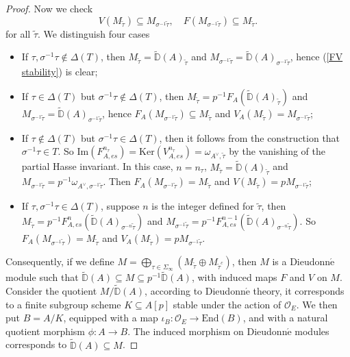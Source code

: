 \documentclass{article}
\begin{document}
\begin{proof}
Now we check
\begin{equation}\label{FV stability}
V(M_{\tilde\tau})\subseteq M_{\sigma^{-1}\tilde\tau},\quad F(M_{\sigma^{-1}\tilde\tau})\subseteq M_{\tilde\tau}.
\end{equation}
for all $\tilde\tau$. We distinguish four cases
\begin{itemize}
	\item If $\tau,\sigma^{-1}\tau\notin \Delta(T)$, then $M_{\tilde\tau}=\tilde{\mathbb{D}}(A)_{\tilde\tau}$ and $M_{\sigma^{-1}\tilde\tau}=\tilde{\mathbb{D}}(A)_{\sigma^{-1}\tilde\tau}$, hence (\ref{FV stability}) is clear;
	\item If $\tau\in\Delta(T)$ but $\sigma^{-1}\tau\notin\Delta(T)$, then $M_{\tilde\tau}=p^{-1}F_{A}(\tilde{\mathbb{D}}(A)_{\tilde\tau})$ and $M_{\sigma^{-1}\tilde\tau}=\tilde{\mathbb{D}}(A)_{\sigma^{-1}\tilde\tau}$, hence $F_A(M_{\sigma^{-1}\tilde\tau})\subseteq M_{\tilde\tau}$ and $V_A(M_{\tilde\tau})=M_{\sigma^{-1}\tilde\tau}$;
	\item If $\tau\notin\Delta(T)$ but $\sigma^{-1}\tau\in\Delta(T)$, then it follows from the construction that $\sigma^{-1}\tau\in T$. So $\text{Im}(F^{n_\tau}_{A,es})=\text{Ker}(V^{n_\tau}_{A,es})=\omega_{A^\vee,\tilde\tau}$ by the vanishing of the partial Hasse invariant. In this case, $n=n_\tau$, $M_{\tilde\tau}=\tilde{\mathbb{D}}(A)_{\tilde\tau}$ and $M_{\sigma^{-1}\tilde\tau}=p^{-1}\omega_{A^\vee,\sigma^{-1}\tilde\tau}$. Then $F_A(M_{\sigma^{-1}\tilde\tau})=M_{\tilde\tau}$ and $V(M_{\tilde\tau})=pM_{\sigma^{-1}\tilde\tau}$;
	\item If $\tau,\sigma^{-1}\tau\in\Delta(T)$, suppose $n$ is the integer defined for $\tilde\tau$, then $M_{\tilde\tau}=p^{-1}F_{A,es}^n(\tilde{\mathbb{D}}(A)_{\sigma^{-n}\tilde\tau})$ and $M_{\sigma^{-1}\tilde\tau}=p^{-1}F_{A,es}^{n-1}(\tilde{\mathbb{D}}(A)_{\sigma^{-n}\tilde\tau})$. So $F_A(M_{\sigma^{-1}\tilde\tau})=M_{\tilde\tau}$ and $V_A(M_{\tilde\tau})=pM_{\sigma^{-1}\tilde\tau}$.
\end{itemize}

Consequently, if we define $M=\bigoplus_{\tau\in\Sigma_{\infty}}(M_{\tilde\tau}\oplus M_{\tilde\tau^c})$, then $M$ is a Dieudonn$\acute{\text{e}}$ module such that $\tilde{\mathbb{D}}(A)\subseteq M\subseteq p^{-1}\tilde{\mathbb{D}}(A)$, with induced maps $F$ and $V$ on $M$. Consider the quotient $M/\tilde{\mathbb{D}}(A)$, according to Dieudonn$\acute{\text{e}}$ theory, it corresponds to a finite subgroup scheme $K\subseteq A[p]$ stable under the action of $\mathcal{O}_E$. We then put $B=A/K$, equipped with a map $\iota_B:\mathcal{O}_E\to \text{End}(B)$, and with a natural quotient morphism $\phi:A\to B$. The induced morphism on Dieudonn$\acute{\text{e}}$ modules corresponds to $\tilde{\mathbb{D}}(A)\subseteq M$.


\end{proof}
\end{document}
